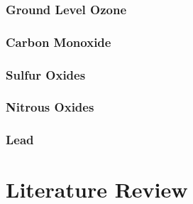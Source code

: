 \subsubsection{Ground Level Ozone}%
\label{ssub:ground_level_ozone}

\subsubsection{Carbon Monoxide}%
\label{ssub:carbon_monoxide}

\subsubsection{Sulfur Oxides}%
\label{ssub:sulfur_oxides}

\subsubsection{Nitrous Oxides}%
\label{ssub:nitrous_oxides}

\subsubsection{Lead}%
\label{ssub:lead}
















\section{Literature Review}%
\label{sec:literature_review}
